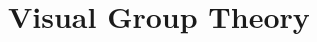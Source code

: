 \documentclass[12pt,openany]{book}
\begin{document}
	
	
	\tableofcontents
	\newpage
	
	\chapter{Visual Group Theory}
	
	
	\newpage
	\appendix
%	
	
\end{document}
